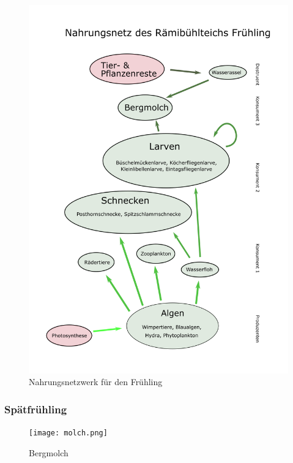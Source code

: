 \documentclass{article}
\begin{document}
            \begin{figure}[H]
            \centering
            \includegraphics[scale=0.75]{NewNetz1.png}
            \caption{Nahrungsnetzwerk für den Frühling}
            \label{fig:universe}
            \end{figure}
            
            \newpage
        
        \subsubsection{Spätfrühling}
        
        
            \begin{figure}[h!]
            \centering
            \texttt{[image: molch.png]}
            \caption{Bergmolch}
            \label{fig:universe}
            \end{figure}
            
\end{document}
